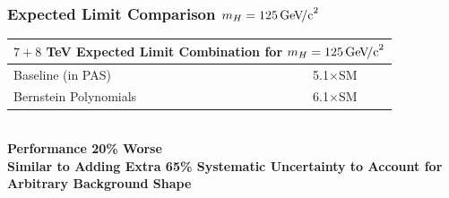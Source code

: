 \documentclass{beamer}
\newcommand{\GeVcc}{\ensuremath{\,\mathrm{Ge\kern -0.1em V\!/c}^2}}
\begin{document}
\begin{frame}
\frametitle{Expected Limit Comparison $m_H=125\GeVcc{}$}
\begin{center}
\begin{tabular}{|l|c|} \hline
\multicolumn{2}{|c|}{ $7+8$ TeV Expected Limit Combination for $m_H=125\GeVcc{}$} \\ \hline
Baseline (in PAS)          &    5.1$\times$SM      \\ \hline
Bernstein Polynomials          &    6.1$\times$SM      \\ \hline
\end{tabular}
\\ \vspace{1em}
\large
\textbf{
Performance 20\% Worse
\\
Similar to Adding Extra 65\% Systematic Uncertainty to Account for Arbitrary Background Shape
}
\end{center}
\end{frame}
\end{document}
